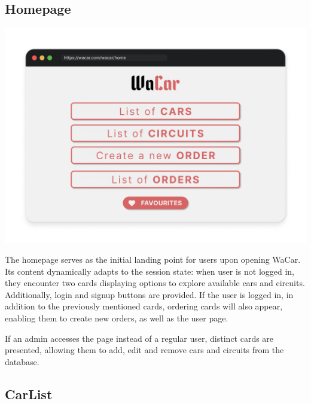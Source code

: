 \subsection{Homepage}

\begin{center}
	\includegraphics[scale=0.3]{./mockup/user_home.png}
	\label{ERSchema}
\end{center}

The homepage serves as the initial landing point for users upon opening WaCar. Its content dynamically adapts to the session state: when user is not logged in, 
they encounter two cards displaying options to explore available cars and circuits. Additionally, login and signup buttons are provided.
If the user is logged in, in addition to the previously mentioned cards, ordering cards will also appear, enabling them to create new orders, as well as the user page.

If an admin accesses the page instead of a regular user, distinct cards are presented, allowing them to add, edit and remove cars and circuits from the database.

\subsection{CarList}

